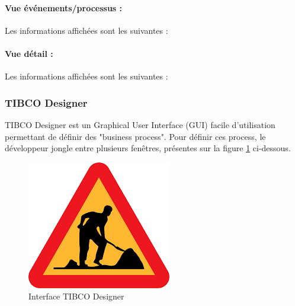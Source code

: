 \paragraph{Vue événements/processus :} Les informations affichées sont les suivantes :
\paragraph{Vue détail : } Les informations affichées sont les suivantes :
\subsubsection{TIBCO Designer}
TIBCO Designer est un Graphical User Interface (GUI) facile d'utilisation permettant de
définir des "business process". Pour définir ces process, le développeur jongle entre plusieurs
fenêtres, présentes sur la figure \ref{fig:encours} ci-dessous.
\begin{figure}[h!]
	\centering
	\includegraphics[width=0.5\linewidth]{img/encours}
	\caption{Interface TIBCO Designer}
	\label{fig:encours}
\end{figure}
